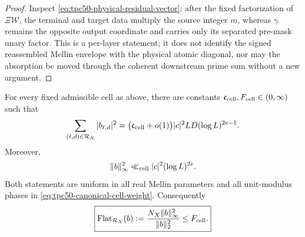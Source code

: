 \begin{proof}
Inspect \eqref{eq:tpc50-physical-residual-vector}: after the fixed
factorization of \(\Xi\mathcal W\), the terminal and target data multiply
the source integer \(m\), whereas \(\gamma\) remains the opposite output
coordinate and carries only its separated pre-mask unary factor.  This
is a per-layer statement; it does not identify the signed reassembled
Mellin envelope with the physical atomic diagonal, nor may the
absorption be moved through the coherent downstream prime sum without a
new argument.
\end{proof}

\begin{theorem}
\label{thm:tpc50-fixed-cell-energy}
For every fixed admissible cell as above, there are constants
\(\mathfrak c_{\rm cell},F_{\rm cell}\in(0,\infty)\) such that
\begin{equation}
 \sum_{(\ell,d)\in\mathcal R_X}|b_{\ell,d}|^2
 =\bigl(\mathfrak c_{\rm cell}+o(1)\bigr)
 |c|^2LD(\log L)^{2e-1}.
 \label{eq:tpc50-fixed-cell-l2-asymptotic}
\end{equation}
Moreover,
\begin{equation}
 \|b\|_\infty^2\ll_{\rm cell}|c|^2(\log L)^{2e}.
 \label{eq:tpc50-fixed-cell-linfty}
\end{equation}
Both statements are uniform in all real Mellin parameters and all
unit-modulus phases in \eqref{eq:tpc50-canonical-cell-weight}.
Consequently
\begin{equation}
 \boxed{
 \operatorname{Flat}_{\mathcal R_X}(b)
 :=\frac{N_X\|b\|_\infty^2}{\|b\|_2^2}
 \leq F_{\rm cell}.}
 \label{eq:tpc50-fixed-cell-flatness}
\end{equation}
\end{theorem}


